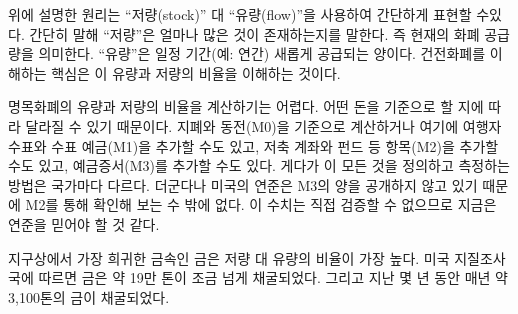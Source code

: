 \begin{comment}	
The principle outlined above can be expressed more generally as the
ratio of \enquote{stock} to \enquote{flow}. Simply put, the \textit{stock} is how much of
something is currently there. For our purposes, the stock is a measure
of the current money supply. The \textit{flow} is how much there is produced
over a period of time (e.g. per year). The key to understanding sound
money is in understanding this stock-to-flow ratio.
\end{comment}
위에 설명한 원리는 \enquote{저량(stock)} 대 \enquote{유량(flow)}을 사용하여 간단하게 표현할 수있다.
간단히 말해 \enquote{저량}은 얼마나 많은 것이 존재하는지를 말한다. 즉 현재의 화폐 공급량을 의미한다. 
\enquote{유량}은 일정 기간(예: 연간) 새롭게 공급되는 양이다.
건전화폐를 이해하는 핵심은 이 유량과 저량의 비율을 이해하는 것이다.

\begin{comment}	
Calculating the stock-to-flow ratio for fiat currency is difficult, because how
much money there is depends on how you look at it.~\cite{wiki:money-supply} You
could count only banknotes and coins (M0), add traveler checks and check
deposits (M1), add saving accounts and mutual funds and some other things (M2),
and even add certificates of deposit to all of that (M3). Further, how all of
this is defined and measured varies from country to country and since the US
Federal Reserve stopped publishing \cite{web:fed-m3} numbers for M3, we will
have to make do with the M2 monetary supply. I would love to verify these
numbers, but I guess we have to trust the fed for now.
\end{comment}
명목화폐의 유량과 저량의 비율을 계산하기는 어렵다. 
어떤 돈을 기준으로 할 지에 따라 달라질 수 있기 때문이다\cite{wiki:money-supply}.
지폐와 동전(M0)을 기준으로 계산하거나 여기에 여행자 수표와 수표 예금(M1)을 추가할 수도 있고, 
저축 계좌와 펀드 등 항목(M2)을 추가할 수도 있고, 예금증서(M3)를 추가할 수도 있다.
게다가 이 모든 것을 정의하고 측정하는 방법은 국가마다 다르다.
더군다나 미국의 연준은 M3의 양을 공개하지 않고 있기 때문에 M2를 통해 확인해 보는 수 밖에 없다.\cite{web:fed-m3}
이 수치는 직접 검증할 수 없으므로 지금은 연준을 믿어야 할 것 같다.

\begin{comment}	
Gold, one of the rarest metals on earth, has the highest stock-to-flow
ratio. According to the US Geological Survey, a little more than 190,000
tons have been mined. In the last few years, around 3100 tons of gold
have been mined per year.~\cite{mineral-commodity-summaries}
\end{comment}
지구상에서 가장 희귀한 금속인 금은 저량 대 유량의 비율이 가장 높다.
미국 지질조사국에 따르면 금은 약 19만 톤이 조금 넘게 채굴되었다.
그리고 지난 몇 년 동안 매년 약 3,100톤의 금이 채굴되었다.~\cite{mineral-commodity-summaries}

